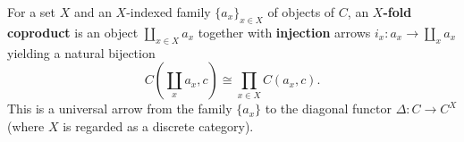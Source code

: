For a set $X$ and an $X$-indexed family $\{a_x\}_{x \in X}$ of objects of $C$, an \textbf{$X$-fold coproduct} is an object $\coprod_{x \in X} a_x$ together with \textbf{injection} arrows $i_x: a_x \to \coprod_x a_x$ yielding a natural bijection
$$C(\coprod_x a_x, c) \cong \prod_{x \in X} C(a_x, c).$$
This is a universal arrow from the family $\{a_x\}$ to the diagonal functor $\Delta: C \to C^X$ (where $X$ is regarded as a discrete category).